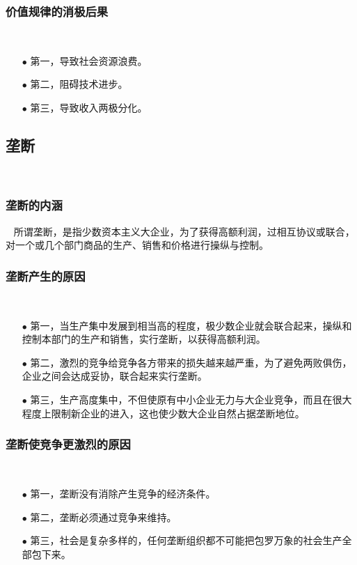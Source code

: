 \documentclass{ctexart}
\begin{document}
\subsubsection{价值规律的消极后果}~{}
\vspace{-5mm}
\begin{itemize}
\item[$\bullet$]第一，导致社会资源浪费。
\item[$\bullet$]第二，阻碍技术进步。
\item[$\bullet$]第三，导致收入两极分化。
\end{itemize}
\newpage

\subsection{垄断}~{}
\vspace{-5mm}

\subsubsection{垄断的内涵}~{}
所谓垄断，是指少数资本主义大企业，为了获得高额利润，过相互协议或联合，对一个或几个部门商品的生产、销售和价格进行操纵与控制。


\subsubsection{垄断产生的原因}~{}
\vspace{-5mm}
\begin{itemize}
\item[$\bullet$]第一，当生产集中发展到相当高的程度，极少数企业就会联合起来，操纵和控制本部门的生产和销售，实行垄断，以获得高额利润。
\item[$\bullet$]第二，激烈的竞争给竞争各方带来的损失越来越严重，为了避免两败俱伤，企业之间会达成妥协，联合起来实行垄断。
\item[$\bullet$]第三，生产高度集中，不但使原有中小企业无力与大企业竞争，而且在很大程度上限制新企业的进入，这也使少数大企业自然占据垄断地位。
\end{itemize}

\subsubsection{垄断使竞争更激烈的原因}~{}
\vspace{-5mm}
\begin{itemize}
\item[$\bullet$]第一，垄断没有消除产生竞争的经济条件。
\item[$\bullet$]第二，垄断必须通过竞争来维持。
\item[$\bullet$]第三，社会是复杂多样的，任何垄断组织都不可能把包罗万象的社会生产全部包下来。
\end{itemize}
\end{document}

